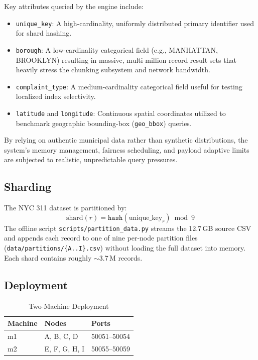 \documentclass[conference]{IEEEtran}
\begin{document}
Key attributes queried by the engine include:
\begin{itemize}
    \item \texttt{unique\_key}: A high-cardinality, uniformly distributed primary identifier used for shard hashing.
    \item \texttt{borough}: A low-cardinality categorical field (e.g., MANHATTAN, BROOKLYN) resulting in massive, multi-million record result sets that heavily stress the chunking subsystem and network bandwidth.
    \item \texttt{complaint\_type}: A medium-cardinality categorical field useful for testing localized index selectivity.
    \item \texttt{latitude} and \texttt{longitude}: Continuous spatial coordinates utilized to benchmark geographic bounding-box (\texttt{geo\_bbox}) queries.
\end{itemize}

By relying on authentic municipal data rather than synthetic distributions, the system's memory management, fairness scheduling, and payload adaptive limits are subjected to realistic, unpredictable query pressures.

\subsection{Sharding}

The NYC 311 dataset is partitioned by:
\[
  \text{shard}(r) = \texttt{hash}(\text{unique\_key}_r) \bmod 9
\]
The offline script \texttt{scripts/partition\_data.py} streams the 12.7\,GB
source CSV and appends each record to one of nine per-node partition files
(\texttt{data/partitions/\{A..I\}.csv}) without loading the full dataset into
memory. Each shard contains roughly $\sim$3.7\,M records.

\subsection{Deployment}

\begin{table}[h]
\centering
\caption{Two-Machine Deployment}
\label{tab:deploy}
\begin{tabular}{lll}
\toprule
Machine & Nodes & Ports \\
\midrule
m1 & A, B, C, D & 50051--50054 \\
m2 & E, F, G, H, I & 50055--50059 \\
\bottomrule
\end{tabular}
\end{table}
\end{document}
